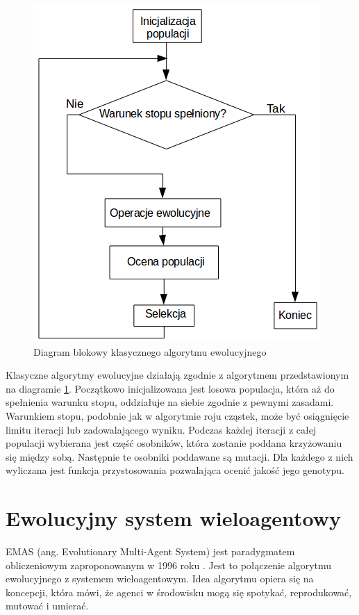 \begin{figure}[H]
\begin{center} 
\includegraphics[scale=0.6]{tresc/pics/GAdiagram.png}
\caption{Diagram blokowy klasycznego algorytmu ewolucyjnego}
\label{fig:GAdiagram}
\end{center}
\end{figure}

Klasyczne algorytmy ewolucyjne działają zgodnie z algorytmem przedstawionym na diagramie \ref{fig:GAdiagram}. Początkowo inicjalizowana jest losowa populacja, która aż do spełnienia warunku stopu, oddziałuje na siebie zgodnie z pewnymi zasadami. Warunkiem stopu, podobnie jak w algorytmie roju cząstek, może być osiągnięcie limitu iteracji lub zadowalającego wyniku. Podczas każdej iteracji z całej populacji wybierana jest część osobników, która zostanie poddana krzyżowaniu się między sobą. Następnie te osobniki poddawane są mutacji. Dla każdego z nich wyliczana jest funkcja przystosowania pozwalająca ocenić jakość jego genotypu.


\section{Ewolucyjny system wieloagentowy}
\label{cha:pyage}
EMAS (ang. Evolutionary Multi-Agent System) jest paradygmatem obliczeniowym zaproponowanym w 1996 roku \cite{emas1}. Jest to połączenie algorytmu ewolucyjnego z systemem wieloagentowym. Idea algorytmu opiera się na koncepcji, która mówi, że agenci w środowisku mogą się spotykać, reprodukować, mutować i umierać.  


